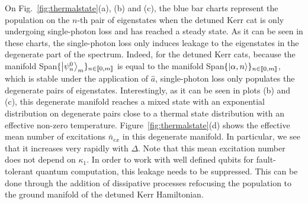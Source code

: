 \documentclass[%
 reprint,
 superscriptaddress,
 amsmath,
 amssymb,
 aps,
 pra,
 10pt
]{revtex4-2}
\newcommand{\hata}{\hat{a}}
\begin{document}
On Fig.~\ref{fig:thermalstate}(a), (b) and (c), the blue bar charts represent the population on the $n$-th pair of eigenstates when the detuned Kerr cat is only undergoing single-photon loss and has reached a steady state. As it can be seen in these charts, the single-photon loss only induces leakage to the eigenstates in the degenerate part of the spectrum. Indeed, for the detuned Kerr cats, because the manifold Span$\{{\ket{\psi^0_n}}_m\}_{n\in  [\![ 0,m]\!]}$ is equal to the manifold Span$\{{\ket{\alpha,n}}\}_{n\in  [\![ 0,m]\!]}$, which is stable under the application of $\hata$, single-photon loss only populates the degenerate pairs of eigenstates. Interestingly, as it can be seen in plots (b) and (c), this degenerate manifold reaches a mixed state with an  exponential distribution on degenerate pairs close to a thermal state distribution with an effective non-zero temperature.  Figure~\ref{fig:thermalstate}(d) shows the effective mean number of excitations $\bar n_{ex}$ in this degenerate manifold. In particular, we see that it increases very rapidly with $\Delta$. Note that this mean excitation number does not depend on $\kappa_1$. In order to work with well defined qubits for fault-tolerant quantum computation, this leakage needs to be suppressed. This can be done through the addition of dissipative processes refocusing the population to the ground manifold of the detuned Kerr Hamiltonian. 
\end{document}
